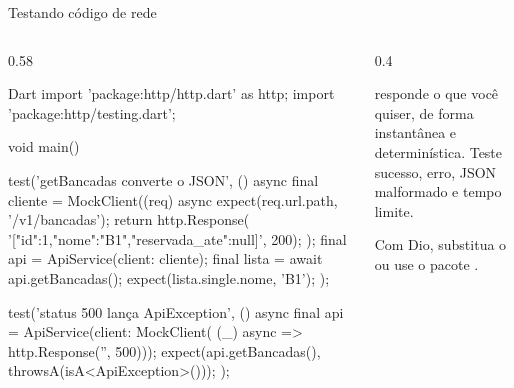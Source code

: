 \documentclass[aspectratio=169,10pt]{beamer}
\begin{document}
\begin{frame}[fragile]{Testando código de rede}
  \begin{columns}[T]
    \begin{column}{0.58\textwidth}
\begin{codigo}[title=test/api\_service\_test.dart]{Dart}
import 'package:http/http.dart' as http;
import 'package:http/testing.dart';

void main() {
  test('getBancadas converte o JSON', () async {
    final cliente = MockClient((req) async {
      expect(req.url.path, '/v1/bancadas');
      return http.Response(
          '[{"id":1,"nome":"B1","reservada_ate":null}]', 200);
    });
    final api = ApiService(client: cliente);
    final lista = await api.getBancadas();
    expect(lista.single.nome, 'B1');
  });

  test('status 500 lança ApiException', () async {
    final api = ApiService(client: MockClient(
        (_) async => http.Response('', 500)));
    expect(api.getBancadas(), throwsA(isA<ApiException>()));
  });
}
\end{codigo}
    \end{column}
    \begin{column}{0.4\textwidth}
      \begin{conceito}
         responde o que você quiser, de forma instantânea e determinística. Teste sucesso, erro, JSON malformado e tempo limite.
      \end{conceito}
      \begin{dica}
        Com Dio, substitua o  ou use o pacote .
      \end{dica}
    \end{column}
  \end{columns}
\end{frame}
\end{document}
